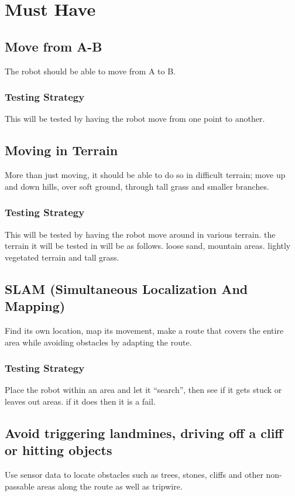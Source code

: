 \newpage

\section{Must Have}

\subsection{Move from A-B}\label{R1}
The robot should be able to move from A to B.

\subsubsection*{Testing Strategy}
This will be tested by having the robot move from one point to another.


\subsection{Moving in Terrain}\label{R2}
More than just moving, it should be able to do so in difficult terrain; move up and down hills, over soft ground, through tall grass and smaller branches.

\subsubsection*{Testing Strategy}
This will be tested by having the robot move around in various terrain. the terrain it will be tested in will be as follows. loose sand, mountain areas. lightly vegetated terrain and tall grass.


\subsection{SLAM (Simultaneous Localization And Mapping)}\label{R3}
Find its own location, map its movement, make a route that covers the entire area while avoiding obstacles by adapting the route.

\subsubsection*{Testing Strategy}
Place the robot within an area and let it “search”, then see if it gets stuck or leaves out areas. if it does then it is a fail.


\subsection{Avoid triggering landmines, driving off a cliff or hitting objects}\label{R4}
Use sensor data to locate obstacles such as trees, stones, cliffs and other non-passable areas along the route as well as tripwire.

